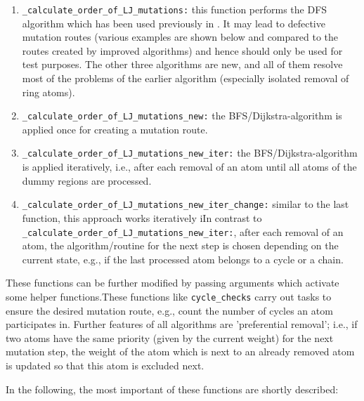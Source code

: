\begin{enumerate}
\item \texttt{\_calculate\_order\_of\_LJ\_mutations:} this function performs the DFS algorithm which has been used previously in {\trafo}. It may lead to  defective mutation routes (various examples are shown below and compared to the routes created by improved algorithms) and hence
should only be used for test purposes. The other three algorithms
are new, and all of them resolve most of the problems of the earlier
algorithm (especially isolated removal of ring atoms).


\item \texttt{\_calculate\_order\_of\_LJ\_mutations\_new:} the BFS/Dijkstra-algorithm is
applied once for creating a mutation route.

\item \texttt{\_calculate\_order\_of\_LJ\_mutations\_new\_iter:} the BFS/Dijkstra-algorithm is
applied iteratively, i.e., after each removal of an atom until all atoms of the dummy regions are processed.

\item \texttt{\_calculate\_order\_of\_LJ\_mutations\_new\_iter\_change:}
similar to the last function, this approach works iteratively iIn contrast to \texttt{\_calculate\_order\_of\_LJ\_mutations\_new\_iter:}, after each removal of an atom, the algorithm/routine for the next step is chosen depending on the current state, e.g., if the last processed atom belongs to a cycle or a chain.
\end{enumerate}

These functions
can be further modified by passing arguments which activate some helper
functions.These functions like \texttt{cycle\_checks} carry out tasks to ensure the
desired mutation route, e.g., count the number of cycles an atom participates
in. Further features of all algorithms are 'preferential removal';
i.e., if two atoms have the same priority (given by the current
weight) for the next mutation step, the weight of the atom which is
next to an already removed atom is updated so that this atom is excluded
next.

In the following, the most important of these functions are shortly described:


